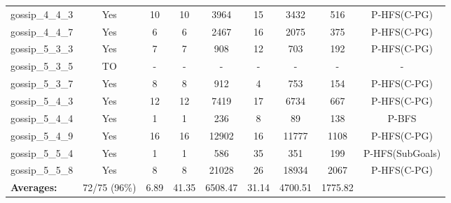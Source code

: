 \documentclass{article}
\begin{document}
\begin{tabular}{lcccccccc}
gossip\_4\_4\_3 & Yes & 10 & 10 & 3964 & 15 & 3432 & 516 & P-HFS(C-PG) \\
gossip\_4\_4\_7 & Yes & 6 & 6 & 2467 & 16 & 2075 & 375 & P-HFS(C-PG) \\
gossip\_5\_3\_3 & Yes & 7 & 7 & 908 & 12 & 703 & 192 & P-HFS(C-PG) \\
gossip\_5\_3\_5 & TO & - & - & - & - & - & - & - \\
gossip\_5\_3\_7 & Yes & 8 & 8 & 912 & 4 & 753 & 154 & P-HFS(C-PG) \\
gossip\_5\_4\_3 & Yes & 12 & 12 & 7419 & 17 & 6734 & 667 & P-HFS(C-PG) \\
gossip\_5\_4\_4 & Yes & 1 & 1 & 236 & 8 & 89 & 138 & P-BFS \\
gossip\_5\_4\_9 & Yes & 16 & 16 & 12902 & 16 & 11777 & 1108 & P-HFS(C-PG) \\
gossip\_5\_5\_4 & Yes & 1 & 1 & 586 & 35 & 351 & 199 & P-HFS(SubGoals) \\
gossip\_5\_5\_8 & Yes & 8 & 8 & 21028 & 26 & 18934 & 2067 & P-HFS(C-PG) \\
\textbf{Averages:} & 72/75 (96\%) & 6.89 & 41.35 & 6508.47 & 31.14 & 4700.51 & 1775.82 & \\
\bottomrule
\end{tabular}
\\[0.7cm]
\end{document}

